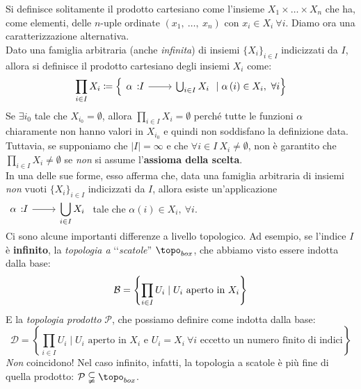 \begin{digression}
	Si definisce solitamente il prodotto cartesiano come l'insieme $X_1\times \ldots \times X_n$ che ha, come elementi, delle $n$-uple ordinate $\left(x_1,\ \ldots,\ x_n\right)$ con $x_i\in X_i\ \forall i$. Diamo ora una caratterizzazione alternativa.\\
	Dato una famiglia arbitraria (anche \textit{infinita}) di insiemi $\{X_i\}_{i\in I}$ indicizzati da $I$, allora si definisce il prodotto cartesiano degli insiemi $X_i$ come:
	\begin{equation}
		\prod_{i\in I}X_i\coloneqq \left\{\funz{\alpha}{I}{\bigcup_{i\in I}X_i}\mid \alpha\left(i\right)\in X_i,\ \forall i\right\}
	\end{equation}
Se $\exists i_0$ tale che $X_{i_0}=\emptyset$, allora $\displaystyle \prod_{i\in I}X_i=\emptyset$ perché tutte le funzioni $\alpha$ chiaramente non hanno valori in $X_{i_0}$ e quindi non soddisfano la definizione data.
Tuttavia, se supponiamo che $\left|I\right|=\infty$ e che $\forall i\in I\ X_i\neq \emptyset$, non è garantito che $\prod_{i\in I}X_i\neq \emptyset$ se \textit{non} si assume l'\textbf{assioma della scelta}.\\
In una delle sue forme, esso afferma che, data una famiglia arbitraria di insiemi \textit{non} vuoti $\{X_i\}_{i\in I}$ indicizzati da $I$, allora esiste un'applicazione $\displaystyle \funz{\alpha}{I}{\displaystyle \bigcup_{i\in I}X_i}$ tale che $\alpha\left(i\right)\in X_i,\ \forall i$.\\
Ci sono alcune importanti differenze a livello topologico. Ad esempio, se l'indice $I$ è \textbf{infinito}, la \textit{topologia a} ‘‘\textit{scatole}'' $\topo_{box}$, che abbiamo visto essere indotta dalla base:
\begin{equation}
	\mathcal{B}=\left\{\prod_{i\in I}U_i\mid U_i\text{ aperto in } X_i\right\}
\end{equation}
E la \textit{topologia prodotto} $\mathcal{P}$, che possiamo definire come indotta dalla base:
\begin{equation}
	\mathcal{D}=\left\{\prod_{i\in I}U_i\mid U_i\text{ aperto in } X_i\text{ e }U_i=X_i\ \forall i\text{ eccetto un numero finito di indici}\right\}
\end{equation}
\textit{Non} coincidono! Nel caso infinito, infatti, la topologia a scatole è più fine di quella prodotto: $\mathcal{P}\subsetneqq \topo_{box}$.
\end{digression}
